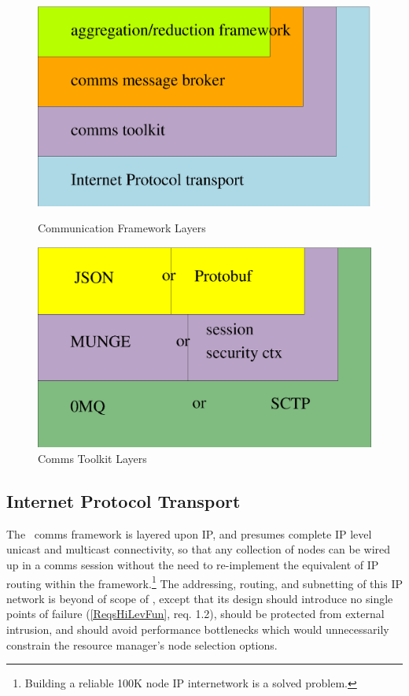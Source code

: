 \begin{figure}
\begin{minipage}[b]{0.45\linewidth}
\centering
\includegraphics[scale=0.30]{../fig/comms.eps}
\caption{Communication Framework Layers}
\label{FigCommsLayers}
\end{minipage}
\hspace{0.5cm}
\begin{minipage}[b]{0.45\linewidth}
\centering
\includegraphics[scale=0.30]{../fig/commstk.eps}
\caption{Comms Toolkit Layers}
\label{FigCommsTK}
\end{minipage}
\end{figure}

\subsection{Internet Protocol Transport}

The \ngrm\ comms framework is layered upon IP, and presumes
complete IP level unicast and multicast connectivity, so that any
collection of nodes can be wired up in a comms session without
the need to re-implement the equivalent of IP routing within
the framework.\footnote{Building a reliable 100K node IP internetwork
is a solved problem.} 
The addressing, routing, and subnetting of this IP network is beyond of
scope of \ngrm, except that its design should introduce no single
points of failure (\ref{ReqsHiLevFun}, req. 1.2), should be protected
from external intrusion, and should avoid performance bottlenecks which
would unnecessarily constrain the resource manager's node selection options.

